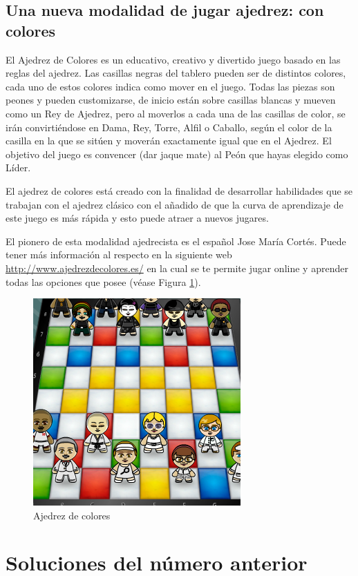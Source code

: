 \subsection*{Una nueva modalidad de jugar ajedrez: con colores}
El Ajedrez de Colores es un educativo, creativo y divertido juego basado en las reglas del ajedrez. Las casillas negras del tablero pueden ser de distintos colores, cada uno de estos colores indica como mover en el juego. Todas las piezas son peones y pueden customizarse, de inicio están sobre casillas blancas y mueven como un Rey de Ajedrez, pero al moverlos a cada una de las casillas de color, se irán convirtiéndose en Dama, Rey, Torre, Alfil o Caballo, según el color de la casilla en la que se sitúen y moverán exactamente igual que en el Ajedrez. El objetivo del juego es convencer (dar jaque mate)  al Peón que hayas elegido como Líder.

El ajedrez de colores está creado con la finalidad de desarrollar habilidades que se trabajan con el ajedrez clásico con el añadido de que la curva de aprendizaje de este juego es más rápida y esto puede atraer a nuevos jugares. 

El pionero de esta modalidad ajedrecista es el español Jose María Cortés. Puede tener más información al respecto en la siguiente web \url{http://www.ajedrezdecolores.es/} en la cual se te permite jugar online y aprender todas las opciones que posee (véase Figura  \ref{colores}).

\begin{figure}[!ht]
\centering \includegraphics[scale=0.4]{colores.png}
\caption{Ajedrez de colores}\label{colores}
\end{figure}

\section*{\textcolor{redsol}{Soluciones del número anterior}}
